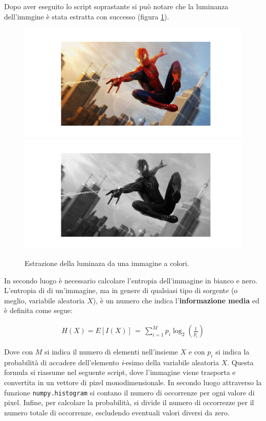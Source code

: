 \noindent Dopo aver eseguito lo script soprastante si può notare che la luminanza dell'immgine è stata estratta con successo (figura \ref{fig:luminanza}).

\begin{figure}
    \centering
    \includegraphics[width = .7\textwidth]{hw-1/report/imgs/colored.png}
    \includegraphics[width = .7\textwidth]{hw-1/report/imgs/grayscale.png}
    \caption{Estrazione della luminaza da una immagine a colori.}
    \label{fig:luminanza}
\end{figure}

\FloatBarrier\noindent In secondo luogo è necessario calcolare l'entropia dell'immagine in bianco e nero. L'entropia di di un'immagine, ma in genere di qualsiasi tipo di sorgente (o meglio, variabile aleatoria $X$), è un numero che indica l'\textbf{informazione media} ed è definita come segue:

\begin{gather*}
    H(X) = E[I(X)] \, = \, \sum_{i = 1}^M p_i\log_2\left( \frac{1}{p_i} \right)
\end{gather*}

\noindent Dove con $M$ si indica il numero di elementi nell'insieme $X$ e con $p_i$ si indica la probabilità di accadere dell'elemento \textit{i}-esimo della variabile aleatoria $X$. Questa formula si riassume nel seguente script, dove l'immagine viene trasporta e convertita in un vettore di pizel monodimensionale. In secondo luogo attraverso la funzione \texttt{numpy.histogram} si contano il numero di occorrenze per ogni valore di pixel. Infine, per calcolare la probabilità, si divide il numero di occorrezze per il numero totale di occorrenze, escludendo eventuali valori diversi da zero.


